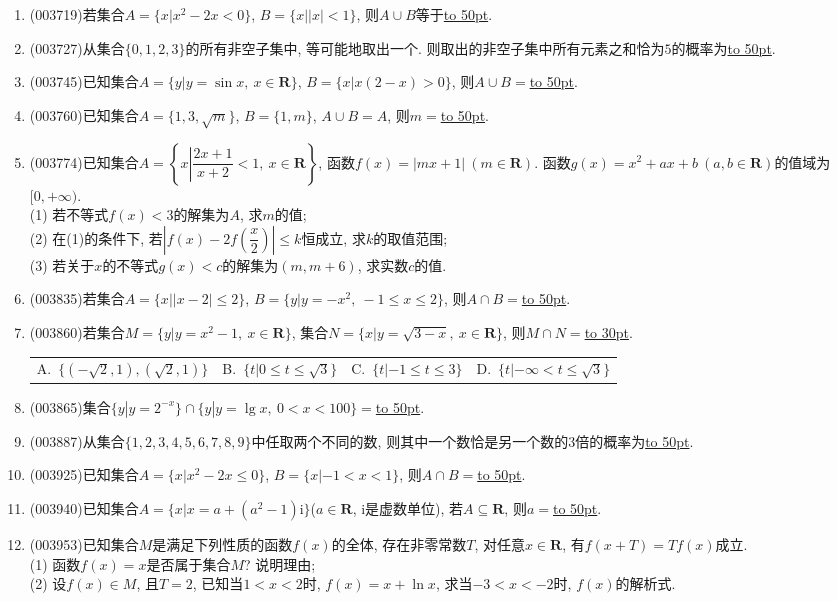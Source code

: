 \documentclass[10pt,a4paper]{article}
\newcommand{\blank}[1]{\underline{\hbox to #1pt{}}}
\newcommand{\fourch}[4]{\par\begin{tabular}{p{.23\textwidth}p{.23\textwidth}p{.23\textwidth}p{.23\textwidth}}
A.~#1 &B.~#2& C.~#3& D.~#4
\end{tabular}}
\begin{document}
\begin{enumerate}[1.]
\item {\tiny (003719)}若集合$A=\{x|x^2-2x<0\}$, $B=\{x||x|<1\}$, 则$A\cup B$等于\blank{50}.
\item {\tiny (003727)}从集合$\{0,1,2,3\}$的所有非空子集中, 等可能地取出一个. 则取出的非空子集中所有元素之和恰为$5$的概率为\blank{50}.
\item {\tiny (003745)}已知集合$A=\{y|y=\sin x, \ x\in \mathbf{R}\}$, $B=\{x|x(2-x)>0\}$, 则$A\cup B=$\blank{50}.
\item {\tiny (003760)}已知集合$A=\{1,3,\sqrt{m}\}$, $B=\{1,m\}$, $A\cup B=A$, 则$m=$\blank{50}.
\item {\tiny (003774)}已知集合$A=\left\{x\left|\dfrac{2x+1}{x+2}<1, \ x\in \mathbf{R}\right.\right\}$, 函数$f(x)=|mx+1| \ (m\in \mathbf{R})$. 函数$g(x)=x^2+ax+b \ (a,b\in \mathbf{R})$的值域为$[0,+\infty)$.\\
(1) 若不等式$f(x)<3$的解集为$A$, 求$m$的值;\\
(2) 在(1)的条件下, 若$\left|f(x)-2f\left(\dfrac x 2\right)\right|\le k$恒成立, 求$k$的取值范围;\\
(3) 若关于$x$的不等式$g(x)<c$的解集为$(m,m+6)$, 求实数$c$的值.
\item {\tiny (003835)}若集合$A=\{x||x-2|\le 2\}$, $B=\{y|y=-x^2, \ -1\le x\le 2\}$, 则$A\cap B=$\blank{50}.
\item {\tiny (003860)}若集合$M=\{y|y=x^2-1, \ x\in \mathbf{R}\}$, 集合$N=\{x|y=\sqrt{3-x}, \ x\in \mathbf{R}\}$, 则$M\cap N=$\blank{30}.
\fourch{$\{(-\sqrt{2},1),(\sqrt{2},1)\}$}{$\{t|0\le t\le \sqrt{3}\}$}{$\{t|-1\le t\le 3\}$}{$\{t|-\infty<t\le \sqrt{3}\}$}
\item {\tiny (003865)}集合$\{y|y=2^{-x}\}\cap\{y|y=\lg x, \ 0<x<100\}=$\blank{50}.
\item {\tiny (003887)}从集合$\{1,2,3,4,5,6,7,8,9\}$中任取两个不同的数, 则其中一个数恰是另一个数的$3$倍的概率为\blank{50}.
\item {\tiny (003925)}已知集合$A=\{x|x^2-2x\le 0 \}$, $B=\{x|-1<x<1\}$, 则$A\cap B=$\blank{50}.
\item {\tiny (003940)}已知集合$A=\{x|x=a+(a^2-1)\mathrm{i}\}$($a\in \mathbf{R}$, $\mathrm{i}$是虚数单位), 若$A\subseteq \mathbf{R}$, 则$a=$\blank{50}.
\item {\tiny (003953)}已知集合$M$是满足下列性质的函数$f(x)$的全体, 存在非零常数$T$, 对任意$x\in \mathbf{R}$, 有$f(x+T)=Tf(x)$成立.\\
(1) 函数$f(x)=x$是否属于集合$M$? 说明理由;\\
(2) 设$f(x)\in M$, 且$T=2$, 已知当$1<x<2$时, $f(x)=x+\ln x$, 求当$-3<x<-2$时, $f(x)$的解析式.

\end{enumerate}
\end{document}
